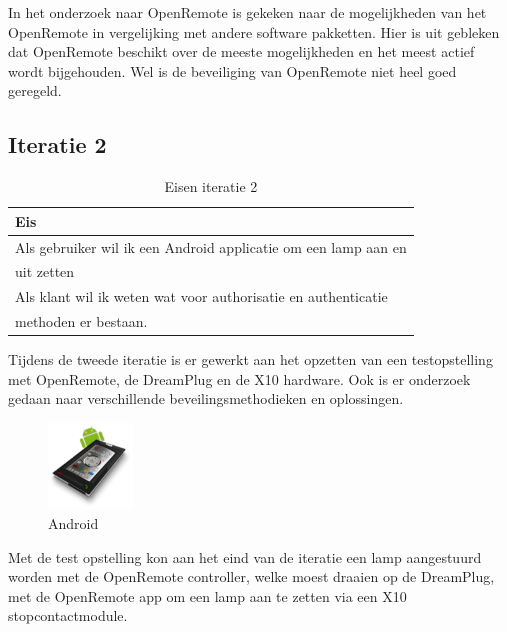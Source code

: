 \documentclass[]{article}
\begin{document}
In het onderzoek naar OpenRemote is gekeken naar de mogelijkheden van het
OpenRemote in vergelijking met andere software pakketten. Hier is uit
gebleken dat OpenRemote beschikt over de meeste mogelijkheden en het meest
actief wordt bijgehouden. Wel is de beveiliging van OpenRemote niet heel
goed geregeld.

\subsection{Iteratie 2}
\begin{table}[htpb]
  \caption{Eisen iteratie 2}
  \begin{center}
    \begin{tabular}{|| l ||}\hline
        Eis                                                              \\\hline\hline
        Als gebruiker wil ik een Android applicatie om een lamp aan en   \\ 
        uit zetten                                                       \\\hline
        Als klant wil ik weten wat voor authorisatie en authenticatie    \\
        methoden er bestaan.                                             \\\hline
    \end{tabular}
  \end{center}
\end{table}

Tijdens de tweede iteratie is er gewerkt aan het opzetten van een
testopstelling met OpenRemote, de DreamPlug en de X10 hardware. Ook is er
onderzoek gedaan naar verschillende beveilingsmethodieken en oplossingen.

\begin{figure}
  \begin{center}
    \includegraphics[width=0.20\textwidth]{android.pdf}
  \end{center}
  \caption{Android}
\end{figure}

Met de test opstelling kon aan het eind van de iteratie een lamp
aangestuurd worden met de OpenRemote controller, welke moest draaien op de
DreamPlug, met de OpenRemote app om een lamp aan te zetten via een X10
stopcontactmodule.
\end{document}
